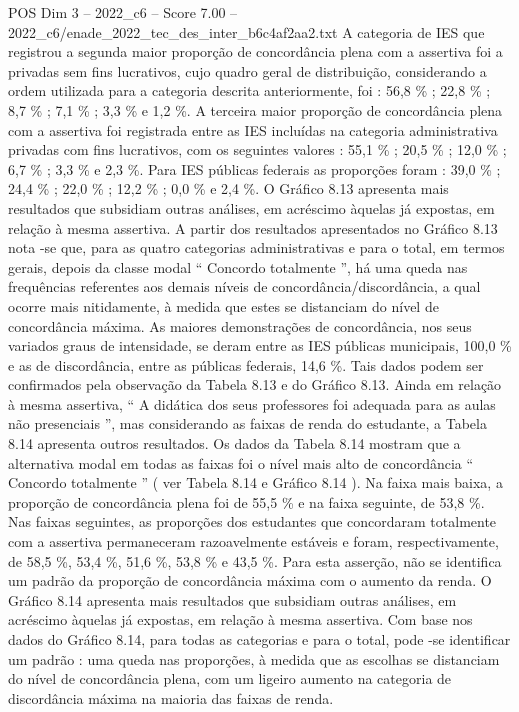\begin{textsample}{POS Dim 3 – 2022\_c6 – Score 7.00 – 2022\_c6/enade\_2022\_tec\_des\_inter\_b6c4af2aa2.txt}
A categoria de IES que registrou a segunda maior proporção de concordância plena com a assertiva foi a privadas sem fins lucrativos, cujo quadro geral de distribuição, considerando a ordem utilizada para a categoria descrita anteriormente, foi : 56,8 \% ; 22,8 \% ; 8,7 \% ; 7,1 \% ; 3,3 \% e 1,2 \%.
A terceira maior proporção de concordância plena com a assertiva foi registrada entre as IES incluídas na categoria administrativa privadas com fins lucrativos, com os seguintes valores : 55,1 \% ; 20,5 \% ; 12,0 \% ; 6,7 \% ; 3,3 \% e 2,3 \%.
Para IES públicas federais as proporções foram : 39,0 \% ; 24,4 \% ; 22,0 \% ; 12,2 \% ; 0,0 \% e 2,4 \%.
O Gráfico 8.13 apresenta mais resultados que subsidiam outras análises, em acréscimo àquelas já expostas, em relação à mesma assertiva.
A partir dos resultados apresentados no Gráfico 8.13 nota -se que, para as quatro categorias administrativas e para o total, em termos gerais, depois da classe modal “ Concordo totalmente ”, há uma queda nas frequências referentes aos demais níveis de concordância/discordância, a qual ocorre mais nitidamente, à medida que estes se distanciam do nível de concordância máxima.
As maiores demonstrações de concordância, nos seus variados graus de intensidade, se deram entre as IES públicas municipais, 100,0 \% e as de discordância, entre as públicas federais, 14,6 \%.
Tais dados podem ser confirmados pela observação da Tabela 8.13 e do Gráfico 8.13.
Ainda em relação à mesma assertiva, “ A didática dos seus professores foi adequada para as aulas não presenciais ”, mas considerando as faixas de renda do estudante, a Tabela 8.14 apresenta outros resultados.
Os dados da Tabela 8.14 mostram que a alternativa modal em todas as faixas foi o nível mais alto de concordância “ Concordo totalmente ” ( ver Tabela 8.14 e Gráfico 8.14 ).
Na faixa mais baixa, a proporção de concordância plena foi de 55,5 \% e na faixa seguinte, de 53,8 \%.
Nas faixas seguintes, as proporções dos estudantes que concordaram totalmente com a assertiva permaneceram razoavelmente estáveis e foram, respectivamente, de 58,5 \%, 53,4 \%, 51,6 \%, 53,8 \% e 43,5 \%.
Para esta asserção, não se identifica um padrão da proporção de concordância máxima com o aumento da renda.
O Gráfico 8.14 apresenta mais resultados que subsidiam outras análises, em acréscimo àquelas já expostas, em relação à mesma assertiva.
Com base nos dados do Gráfico 8.14, para todas as categorias e para o total, pode -se identificar um padrão : uma queda nas proporções, à medida que as escolhas se distanciam do nível de concordância plena, com um ligeiro aumento na categoria de discordância máxima na maioria das faixas de renda.

\end{textsample}
